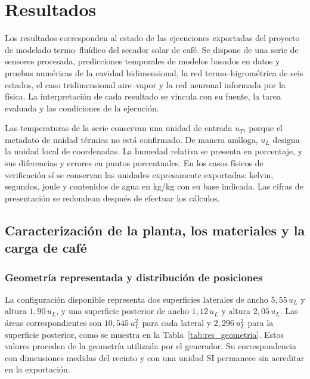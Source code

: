 \providecommand{\rutafigurasresultados}{resultados_recursos/figures}

\chapter{Resultados}
\label{ch:resultados}

Los resultados corresponden al estado de las ejecuciones exportadas del proyecto de modelado termo--fluídico del secador solar de café. Se dispone de una serie de sensores procesada, predicciones temporales de modelos basados en datos y pruebas numéricas de la cavidad bidimensional, la red termo--higrométrica de seis estados, el caso tridimensional aire--vapor y la red neuronal informada por la física. La interpretación de cada resultado se vincula con su fuente, la tarea evaluada y las condiciones de la ejecución.


Las temperaturas de la serie conservan una unidad de entrada $u_T$, porque el metadato de unidad térmica no está confirmado. De manera análoga, $u_L$ designa la unidad local de coordenadas. La humedad relativa se presenta en porcentaje, y sus diferencias y errores en puntos porcentuales. En los casos físicos de verificación sí se conservan las unidades expresamente exportadas: kelvin, segundos, joule y contenidos de agua en kg/kg con su base indicada. Las cifras de presentación se redondean después de efectuar los cálculos.

\section{Caracterización de la planta, los materiales y la carga de café}
\label{res:caracterizacion_planta}

\subsection{Geometría representada y distribución de posiciones}

La configuración disponible representa dos superficies laterales de ancho $5{,}55\,u_L$ y altura $1{,}90\,u_L$, y una superficie posterior de ancho $1{,}12\,u_L$ y altura $2{,}05\,u_L$. Las áreas correspondientes son $10{,}545\,u_L^2$ para cada lateral y $2{,}296\,u_L^2$ para la superficie posterior, como se muestra en la Tabla~\ref{tab:res_geometria}. Estos valores proceden de la geometría utilizada por el generador. Su correspondencia con dimensiones medidas del recinto y con una unidad SI permanece sin acreditar en la exportación.

